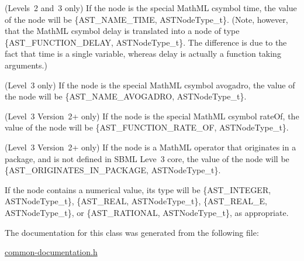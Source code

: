 \begin{DoxyItemize}
\item (Levels~2 and~3 only) If the node is the special Math\+ML csymbol {\ttfamily time}, the value of the node will be \{A\+S\+T\+\_\+\+N\+A\+M\+E\+\_\+\+T\+I\+ME, A\+S\+T\+Node\+Type\+\_\+t\}. (Note, however, that the Math\+ML csymbol {\ttfamily delay} is translated into a node of type \{A\+S\+T\+\_\+\+F\+U\+N\+C\+T\+I\+O\+N\+\_\+\+D\+E\+L\+AY, A\+S\+T\+Node\+Type\+\_\+t\}. The difference is due to the fact that {\ttfamily time} is a single variable, whereas {\ttfamily delay} is actually a function taking arguments.)\end{DoxyItemize}
\begin{DoxyItemize}
\item (Level~3 only) If the node is the special Math\+ML csymbol {\ttfamily avogadro}, the value of the node will be \{A\+S\+T\+\_\+\+N\+A\+M\+E\+\_\+\+A\+V\+O\+G\+A\+D\+RO, A\+S\+T\+Node\+Type\+\_\+t\}.\end{DoxyItemize}
\begin{DoxyItemize}
\item (Level~3 Version~2+ only) If the node is the special Math\+ML csymbol {\ttfamily rate\+Of}, the value of the node will be \{A\+S\+T\+\_\+\+F\+U\+N\+C\+T\+I\+O\+N\+\_\+\+R\+A\+T\+E\+\_\+\+OF, A\+S\+T\+Node\+Type\+\_\+t\}.\end{DoxyItemize}
\begin{DoxyItemize}
\item (Level~3 Version~2+ only) If the node is a Math\+ML operator that originates in a package, and is not defined in S\+B\+ML Leve~3 core, the value of the node will be \{A\+S\+T\+\_\+\+O\+R\+I\+G\+I\+N\+A\+T\+E\+S\+\_\+\+I\+N\+\_\+\+P\+A\+C\+K\+A\+GE, A\+S\+T\+Node\+Type\+\_\+t\}.\end{DoxyItemize}
\begin{DoxyItemize}
\item If the node contains a numerical value, its type will be \{A\+S\+T\+\_\+\+I\+N\+T\+E\+G\+ER, A\+S\+T\+Node\+Type\+\_\+t\}, \{A\+S\+T\+\_\+\+R\+E\+AL, A\+S\+T\+Node\+Type\+\_\+t\}, \{A\+S\+T\+\_\+\+R\+E\+A\+L\+\_\+E, A\+S\+T\+Node\+Type\+\_\+t\}, or \{A\+S\+T\+\_\+\+R\+A\+T\+I\+O\+N\+AL, A\+S\+T\+Node\+Type\+\_\+t\}, as appropriate. \end{DoxyItemize}


The documentation for this class was generated from the following file\+:\begin{DoxyCompactItemize}
\item 
\hyperlink{common-documentation_8h}{common-\/documentation.\+h}\end{DoxyCompactItemize}
